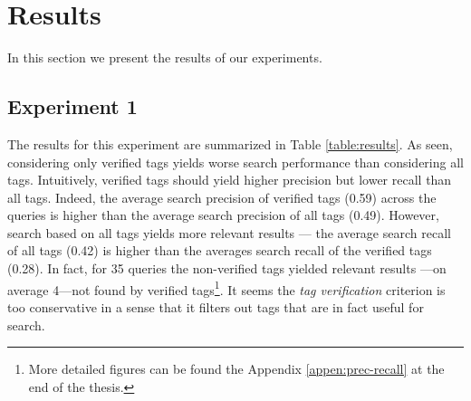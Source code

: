 \section{Results}\label{sec:results}
In this section we present the results of our experiments.
\subsection{Experiment 1}
The results for this experiment are summarized in Table \ref{table:results}. As seen, considering only verified tags yields worse search performance than considering all tags. Intuitively, verified tags should yield higher precision but lower recall than all tags. Indeed, the average search precision of verified tags (0.59) across the queries is higher than the average search precision of all tags (0.49). However, search based on all tags yields more relevant results --- the average search recall of all tags (0.42) is higher than the averages search recall of the verified tags (0.28). In fact, for 35 queries the non-verified tags yielded relevant results ---on average 4---not found by verified tags\footnote{More detailed figures can be found the Appendix \ref{appen:prec-recall} at the end of the thesis.}. It seems the \textit{tag verification} criterion is too conservative in a sense that it filters out tags that are in fact useful for search.

